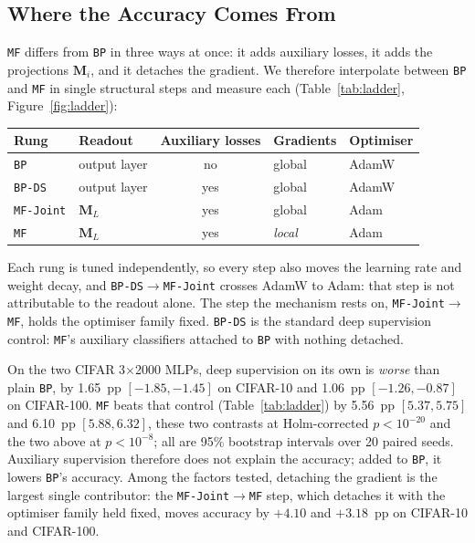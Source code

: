 \documentclass{llncs}
\newcommand{\MF}{\texttt{MF}}
\newcommand{\BP}{\texttt{BP}}
\newcommand{\BPDS}{\texttt{BP-DS}}
\newcommand{\MFJ}{\texttt{MF-Joint}}
\begin{document}
\subsection{Where the Accuracy Comes From}
\label{sec:ladder}


\MF{} differs from \BP{} in three ways at once: it adds auxiliary losses, it
adds the projections $\mathbf{M}_i$, and it detaches the gradient. We therefore
interpolate between \BP{} and \MF{} in single structural steps and measure each (Table~\ref{tab:ladder}, Figure~\ref{fig:ladder}):

\begin{center}\footnotesize
\setlength{\tabcolsep}{6pt}
\begin{tabular}{llcll}
  \toprule
  Rung    & Readout       & Auxiliary losses & Gradients & Optimiser \\
  \midrule
  \BP{}   & output layer  & no  & global & AdamW \\
  \BPDS{} & output layer  & yes & global & AdamW \\
  \MFJ{}  & $\mathbf{M}_L$ & yes & global & Adam \\
  \MF{}   & $\mathbf{M}_L$ & yes & \emph{local} & Adam \\
  \bottomrule
\end{tabular}
\end{center}

Each rung is tuned independently, so every step also moves the learning rate
and weight decay, and \BPDS{}$\rightarrow$\MFJ{} crosses AdamW to Adam: that
step is not attributable to the readout alone. The step the mechanism rests on,
\MFJ{}$\rightarrow$\MF{}, holds the optimiser family fixed.
\BPDS{} is the standard deep supervision control: \MF{}'s
auxiliary classifiers attached to \BP{} with nothing detached.

On the two CIFAR \num{3}$\times$\num{2000} MLPs, deep supervision on its own is
\emph{worse} than plain \BP{}, by \num{1.65}~pp
$[\num{-1.85}, \num{-1.45}]$ on CIFAR-10 and \num{1.06}~pp
$[\num{-1.26}, \num{-0.87}]$ on CIFAR-100. \MF{} beats that control (Table~\ref{tab:ladder}) by
\num{5.56}~pp $[\num{+5.37}, \num{+5.75}]$ and \num{6.10}~pp
$[\num{+5.88}, \num{+6.32}]$, these two contrasts at Holm-corrected $p < 10^{-20}$ and
the two above at $p < 10^{-8}$; all are \num{95}\% bootstrap
intervals over \num{20} paired seeds. Auxiliary supervision therefore does
not explain the accuracy; added to \BP{}, it lowers \BP{}'s accuracy. Among the
factors tested, detaching the gradient is the largest single contributor: the
\MFJ{}$\rightarrow$\MF{} step, which detaches it with the optimiser family
held fixed, moves accuracy by
$+\num{4.10}$ and $+\num{3.18}$~pp on CIFAR-10 and CIFAR-100.
\end{document}
